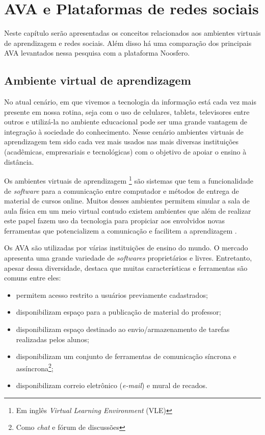 \chapter{AVA e Plataformas de redes sociais}
\label{avas-redes-sociais}

Neste capítulo serão apresentadas os conceitos relacionados aos ambientes virtuais de aprendizagem e redes sociais. Além disso há uma comparação dos principais AVA levantados nessa pesquisa com a plataforma Noosfero.

\section{Ambiente virtual de aprendizagem}
\label{ava}

No atual cenário, em que vivemos a tecnologia da informação está cada vez mais presente em nossa rotina, seja com o uso de celulares, tablets, televisores entre outros e utilizá-la no ambiente educacional pode ser uma grande vantagem de integração à sociedade do conhecimento. Nesse cenário ambientes virtuais de aprendizagem tem sido cada vez mais usados nas mais diversas instituições (acadêmicas, empresariais e tecnológicas) com o objetivo de apoiar o ensino à distância.

Os ambientes virtuais de aprendizagem \footnote{Em inglês \textit{Virtual Learning Environment} (VLE)} são sistemas que tem a funcionalidade de \textit{software} para a comunicação entre computador e métodos de entrega de material de cursos online. Muitos desses ambientes permitem simular a sala de aula física em um meio virtual contudo existem ambientes que além de realizar este papel fazem uso da tecnologia para propiciar aos envolvidos novas ferramentas que potencializem a comunicação e facilitem a aprendizagem \cite{schlemmer2005ambiente}.


Os AVA são utilizadas por várias instituições de ensino do mundo. O mercado apresenta uma grande variedade de \textit{softwares} proprietários e livres. Entretanto, apesar dessa diversidade,  destaca que muitas características e ferramentas são comuns entre eles:
\begin{itemize}
\item permitem acesso restrito a usuários previamente cadastrados;
\item disponibilizam espaço para a publicação de material do professor;
\item disponibilizam espaço destinado ao envio/armazenamento de tarefas realizadas pelos alunos;
\item disponibilizam um conjunto de ferramentas de comunicação síncrona e assíncrona\footnote{Como \textit{chat} e fórum de discussões};
\item disponibilizam correio eletrônico (\textit{e-mail}) e mural de recados.
\end{itemize}

